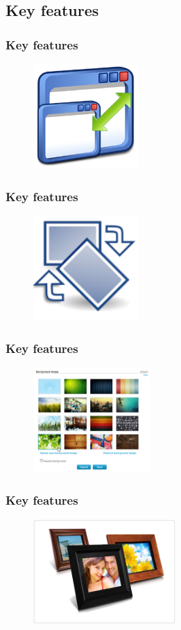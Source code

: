 \documentclass[12pt]{beamer}
\begin{document}
\subsection{Key features}
\begin{frame}
\frametitle{Key features}
\begin{figure}
   \includegraphics[height= 4cm]{images/resize.png}
\end{figure}
\end{frame}

\begin{frame}
\frametitle{Key features}
\begin{figure}
   \includegraphics[height= 4cm]{images/rotate.png}
\end{figure}
\end{frame}

\begin{frame}
\frametitle{Key features}
\begin{figure}
   \includegraphics[height= 4cm]{images/change-background.jpg}
\end{figure}
\end{frame}

\begin{frame}
\frametitle{Key features}
\begin{figure}
   \includegraphics[height= 4cm]{images/photo-frame.jpg}
\end{figure}
\end{frame}
\end{document}
